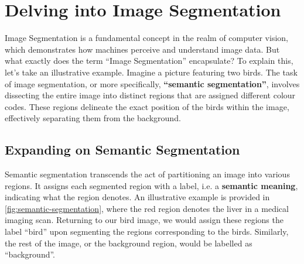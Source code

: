 \section{Delving into Image Segmentation}

Image Segmentation is a fundamental concept in the realm of computer vision, which demonstrates how machines perceive and understand image data. But what exactly does the term “Image Segmentation” encapsulate? To explain this, let's take an illustrative example. Imagine a picture featuring two birds. The task of image segmentation, or more specifically, \textbf{“semantic segmentation”}, involves dissecting the entire image into distinct regions that are assigned different colour codes. These regions delineate the exact position of the birds within the image, effectively separating them from the background.

\subsection{Expanding on Semantic Segmentation}

Semantic segmentation transcends the act of partitioning an image into various regions. It assigns each segmented region with a label, i.e. a \textbf{semantic meaning}, indicating what the region denotes. An illustrative example is provided in \autoref{fig:semantic-segmentation}, where the red region denotes the liver in a medical imaging scan. Returning to our bird image, we would assign these regions the label “bird” upon segmenting the regions corresponding to the birds. Similarly, the rest of the image, or the background region, would be labelled as “background”.


